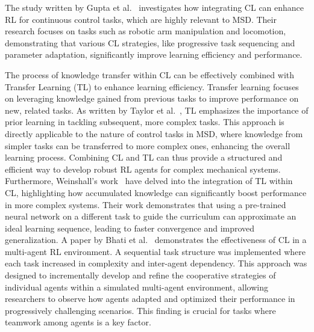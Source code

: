 The study written by Gupta et al.~\cite{gupta2021rlcapabilities} investigates how integrating CL can enhance RL for continuous control tasks, which are highly relevant to MSD. Their research focuses on tasks such as robotic arm manipulation and locomotion, demonstrating that various CL strategies, like progressive task sequencing and parameter adaptation, significantly improve learning efficiency and performance. 

The process of knowledge transfer within CL can be effectively combined with Transfer Learning (TL) to enhance learning efficiency.
Transfer learning focuses on leveraging knowledge gained from previous tasks to improve performance on new, related tasks. As written by Taylor et al.~\cite{taylor2009transferlearning}, TL emphasizes the importance of prior learning in tackling subsequent, more complex tasks. This approach is directly applicable to the nature of control tasks in MSD, where knowledge from simpler tasks can be transferred to more complex ones, enhancing the overall learning process. Combining CL and TL can thus provide a structured and efficient way to develop robust RL agents for complex mechanical systems. Furthermore, Weinshall's work~\cite{weinshall2018cltransfer} have delved into the integration of TL within CL, highlighting how accumulated knowledge can significantly boost performance in more complex systems. Their work demonstrates that using a pre-trained neural network on a different task to guide the curriculum can approximate an ideal learning sequence, leading to faster convergence and improved generalization. 
A paper by Bhati et al.~\cite{bhati2023clmulti} demonstrates the effectiveness of CL in a multi-agent RL environment. A sequential task structure was implemented where each task increased in complexity and inter-agent dependency. This approach was designed to incrementally develop and refine the cooperative strategies of individual agents within a simulated multi-agent environment, allowing researchers to observe how agents adapted and optimized their performance in progressively challenging scenarios. This finding is crucial for tasks where teamwork among agents is a key factor. 

